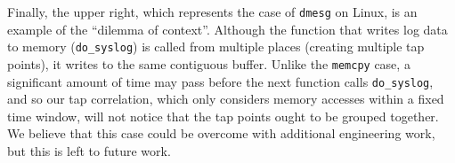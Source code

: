 Finally, the upper right, which represents the case of \texttt{dmesg} on
Linux, is an example of the ``dilemma of context''. Although the
function that writes log data to memory (\texttt{do\_syslog}) is called
from multiple places (creating multiple tap points), it writes to the
same contiguous buffer. Unlike the \texttt{memcpy} case, a significant
amount of time may pass before the next function calls
\texttt{do\_syslog}, and so our tap correlation, which only considers
memory accesses within a fixed time window, will not notice that the tap
points ought to be grouped together. We believe that this case could be
overcome with additional engineering work, but this is left to future
work.

